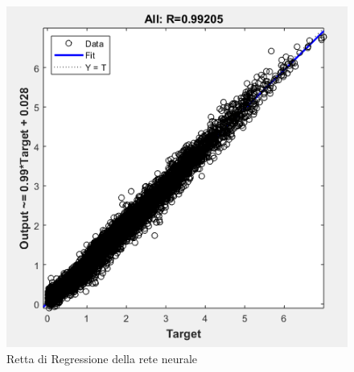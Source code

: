 \begin{figure}[!ht]
\begin{center}
	\includegraphics[scale=0.9]{images/rete1-regression.jpg}
\end{center}
\caption{Retta di Regressione della rete neurale}
\end{figure}